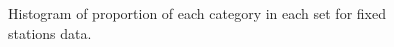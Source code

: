 \documentclass[12pt]{article}\usepackage[]{graphicx}\usepackage[]{color}
\begin{document}
\begin{appendices}
\begin{figure}[htb]
{\centering {} 

}

\caption{Histogram of proportion of each category in each set for fixed stations data.}\label{fig:prop-fix}
\end{figure}
\begin{figure}[htb]

{\centering {} 

}
\end{figure}
\end{appendices}
\end{document}
